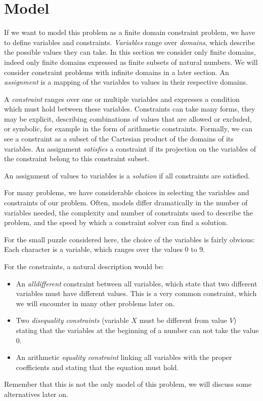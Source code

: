 \documentclass[a4paper]{article}
\begin{document}
\section{Model}
If we want to model this problem as a finite domain constraint problem, we have to define variables and constraints. {\em Variables} range over {\em domains}, which describe the possible values they can take. In this section we consider only finite domains, indeed only finite domains expressed as finite subsets of natural numbers. We will consider constraint problems with infinite domains in a later section. An {\em assignment} is a mapping of the variables to values in their respective domains.

A {\em constraint} ranges over one or multiple variables and expresses a condition which must hold between these variables. Constraints can take many forms, they may be explicit, describing combinations of values that are allowed or excluded, or symbolic, for example in the form of arithmetic constraints. Formally, we can see a constraint as a subset of the Cartesian product of the domains of its variables. An assignment {\em satisfies} a constraint if its projection on the variables of the constraint belong to this constraint subset.

An assignment of values to variables is a {\em solution} if all constraints are satisfied.

For many problems, we have considerable choices in selecting the variables and constraints of our problem. Often, models differ dramatically in the number of variables needed, the complexity and number of constraints used to describe the problem, and the speed by which a constraint solver can find a solution.

For the small puzzle considered here, the choice of the variables is fairly obvious: Each character is a variable, which ranges over the values 0 to 9.

For the constraints, a natural description would be:
\begin{itemize}
\item An {\em alldifferent} constraint between all variables, which state that two different variables must have different values. This is a very common constraint, which we will encounter in many other problems later on.
\item Two {\em disequality constraints} (variable $X$ must be different from value $V$) stating that the variables at the beginning of a number can not take the value 0.
\item An arithmetic {\em equality constraint} linking all variables with the proper coefficients and stating that the equation must hold.
\end{itemize}
Remember that this is not the only model of this problem, we will discuss some alternatives later on.
\end{document}
